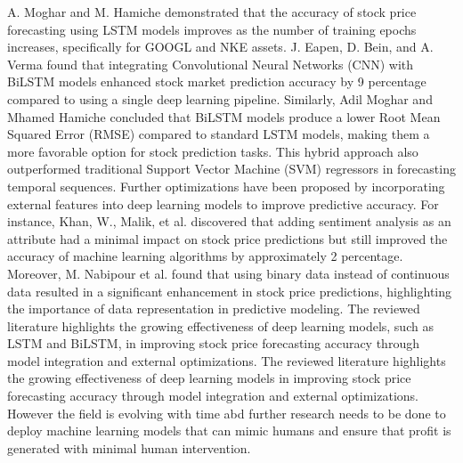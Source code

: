 A. Moghar and M. Hamiche \cite{moghar2020stock} demonstrated that the accuracy of stock price forecasting using LSTM models improves as the number of training epochs increases, specifically for GOOGL and NKE assets. J. Eapen, D. Bein, and A. Verma \cite{eapen2019novel} found that integrating Convolutional Neural Networks (CNN) with BiLSTM models enhanced stock market prediction accuracy by 9 percentage compared to using a single deep learning pipeline. Similarly, Adil Moghar and Mhamed Hamiche \cite{aguirre2018proceedings} concluded that BiLSTM models produce a lower Root Mean Squared Error (RMSE) compared to standard LSTM models, making them a more favorable option for stock prediction tasks. This hybrid approach also outperformed traditional Support Vector Machine (SVM) regressors in forecasting temporal sequences. Further optimizations have been proposed by incorporating external features into deep learning models to improve predictive accuracy. For instance, Khan, W., Malik, et al. \cite{khan2020predicting} discovered that adding sentiment analysis as an attribute had a minimal impact on stock price predictions but still improved the accuracy of machine learning algorithms by approximately 2 percentage. Moreover, M. Nabipour et al. \cite{nabipour2020predicting} found that using binary data instead of continuous data resulted in a significant enhancement in stock price predictions, highlighting the importance of data representation in predictive modeling. The reviewed literature highlights the growing effectiveness of deep learning models, such as LSTM and BiLSTM, in improving stock price forecasting accuracy through model integration and external optimizations. The reviewed literature highlights the growing effectiveness of deep learning models in improving stock price forecasting accuracy through model integration and external optimizations. However the field is evolving with time abd further research needs to be done to deploy machine learning models that can mimic humans and ensure that profit is generated with minimal human intervention.


